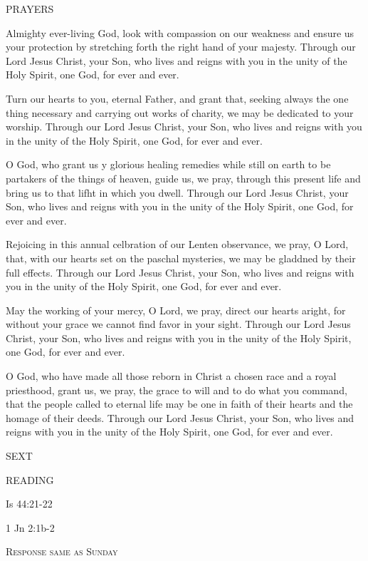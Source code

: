 \noindent\small PRAYERS
\begin{description}[labelindent=\parindent, leftmargin=*]
\item [Saturday after Ash Wednesday:] 	Almighty ever-living God, look with compassion on our weakness and ensure us your protection by stretching forth the right hand of your majesty. Through our Lord Jesus Christ, your Son, who lives and reigns with you in the unity of the Holy Spirit, one God, for ever and ever.
\item [Week 1:] 	Turn our hearts to you, eternal Father, and grant that, seeking always the one thing necessary and carrying out works of charity, we may be dedicated to your worship. Through our Lord Jesus Christ, your Son, who lives and reigns with you in the unity of the Holy Spirit, one God, for ever and ever.
\item [Week 2:] 	O God, who grant us y glorious healing remedies while still on earth to be partakers of the things of heaven, guide us, we pray, through this present life and bring us to that lifht in which you dwell. Through our Lord Jesus Christ, your Son, who lives and reigns with you in the unity of the Holy Spirit, one God, for ever and ever.
\item [Week 3:] 	Rejoicing in this annual celbration of our Lenten observance, we pray, O Lord, that, with our hearts set on the paschal mysteries, we may be gladdned by their full effects. Through our Lord Jesus Christ, your Son, who lives and reigns with you in the unity of the Holy Spirit, one God, for ever and ever.
\item [Week 4:] 	May the working of your mercy, O Lord, we pray, direct our hearts aright, for without your grace we cannot find favor in your sight. Through our Lord Jesus Christ, your Son, who lives and reigns with you in the unity of the Holy Spirit, one God, for ever and ever.
\item [Week 5:] 	O God, who have made all those reborn in Christ a chosen race and a royal priesthood, grant us, we pray, the grace to will and to do what you command, that the people called to eternal life may be one in faith of their hearts and the homage of their deeds. Through our Lord Jesus Christ, your Son, who lives and reigns with you in the unity of the Holy Spirit, one God, for ever and ever.
\end{description}

\begin{flushleft}\normalsize{\uppercase{SEXT\\}}\end{flushleft}
\noindent\small READING
\begin{description}[labelindent=\parindent, leftmargin=*]
\item [Saturday after Ash Wednesday \& Weeks 1-4:]     Is 44:21-22 \textbf{    \\}
\item [Week 5:]    1 Jn 2:1b-2   \textbf{} 
\end{description}

\begin{center}\textsc{Response same as Sunday}\end{center}
